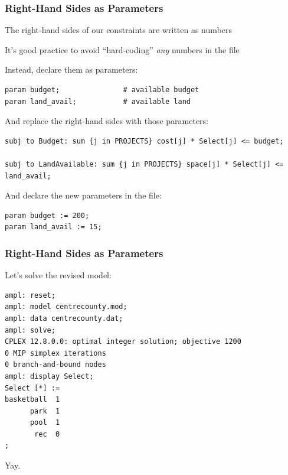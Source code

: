 \begin{frame}[fragile]

	\frametitle{Right-Hand Sides as Parameters}
	
	\bit
	\item The right-hand sides of our constraints are written as numbers
	\item It's good practice  to avoid ``hard-coding'' {\em any} numbers in the  file
	\item Instead, declare them as parameters:
	\eit
	
\begin{lstlisting}
param budget;				# available budget
param land_avail;			# available land
\end{lstlisting}

	\bit
	\item And replace the right-hand sides with those parameters:
	\eit
	
\begin{lstlisting}
subj to Budget: sum {j in PROJECTS} cost[j] * Select[j] <= budget;
	
subj to LandAvailable: sum {j in PROJECTS} space[j] * Select[j] <= land_avail;
\end{lstlisting}

	\bit
	\item And declare the new parameters in the  file:
	\eit
	
\begin{lstlisting}
param budget := 200;
param land_avail := 15;
\end{lstlisting}

\end{frame}

\begin{frame}[fragile]

	\frametitle{Right-Hand Sides as Parameters}
	
	\bit
	\item Let's solve the revised model:
	\eit
	
\begin{lstlisting}
ampl: reset;
ampl: model centrecounty.mod;
ampl: data centrecounty.dat;
ampl: solve;
CPLEX 12.8.0.0: optimal integer solution; objective 1200
0 MIP simplex iterations
0 branch-and-bound nodes
ampl: display Select;
Select [*] :=
basketball  1
      park  1
      pool  1
       rec  0
;
\end{lstlisting}

	\bit
	\item Yay.
	\eit
	
\end{frame}




